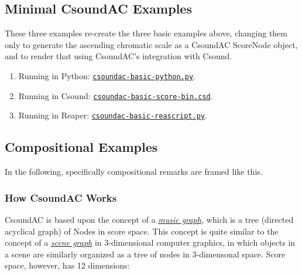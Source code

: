 \documentclass[letterpaper,10pt,DIV=12,parskip=half]{scrartcl}
\begin{document}
\subsection{Minimal CsoundAC Examples}

These three examples re-create the three basic examples above, changing them only to generate the ascending chromatic scale as a CsoundAC ScoreNode object, and to render that using CsoundAC's integration with Csound.

\begin{enumerate}

\item Running in Python: \href{https://github.com/gogins/csound-ac/blob/master/user-guide/csoundac-basic-python.py}{\lstinline|csoundac-basic-python.py|}.

\item Running in Csound: \href{https://github.com/gogins/csound-ac/blob/master/user-guide/csoundac-basic-score-bin.csd}{\lstinline|csoundac-basic-score-bin.csd|}.

\item Running in Reaper: \href{https://github.com/gogins/csound-ac/blob/master/user-guide/csoundac-basic-reascript.py}{\lstinline|csoundac-basic-reascript.py|}.

\end{enumerate}

\subsection{Compositional Examples}

\begin{mdframed}
In the following, specifically compositional remarks are framed like this.
\end{mdframed}

\subsubsection{How CsoundAC Works}

CsoundAC is based upon the concept of a \emph{\href{https://quod.lib.umich.edu/i/icmc/bbp2372.1998.298/1}{music graph},} which is a tree (directed acyclical graph) of Nodes in score space. This concept is quite similar to the concept of a \emph{\href{https://dl.acm.org/doi/pdf/10.1145/360349.360354}{scene graph}} in 3-dimensional computer graphics, in which objects in a scene are similarly organized as a tree of nodes in 3-dimensonal space. Score space, however, has 12 dimensions:
\end{document}
